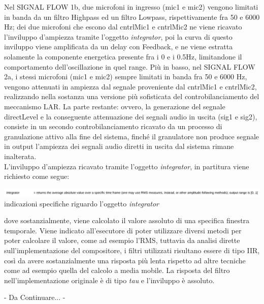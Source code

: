 Nel SIGNAL FLOW 1b,
due microfoni in ingresso (mic1 e mic2) vengono limitati in banda da un filtro Highpass ed 
un filtro Lowpass, rispettivamente fra 50 e 6000 Hz; dei due microfoni che escono 
dal cntrlMic1 e cntrlMic2 ne viene ricavato l'inviluppo d'ampiezza tramite
l'oggetto \textit{integrator}, poi la curva di questo inviluppo viene amplificata da 
un delay con Feedback, e ne viene estratta solamente la componente energetica 
presente fra i 0 e i 0.5Hz, limitandone il comportamento dell'oscillazione in quel range.
Più in basso, nel SIGNAL FLOW 2a, i stessi microfoni (mic1 e mic2) sempre
limitati in banda fra 50 e 6000 Hz, vengono attenuati in ampiezza dal segnale
proveniente dal cntrlMic1 e cntrlMic2, realizzando nella sostanza una 
versione più sofisticata del controbilanciamento del meccanismo LAR.
La parte restante: ovvero, la generazione del segnale directLevel e la 
conseguente attenuazione dei segnali audio in uscita (sig1 e sig2),
consiste in un secondo controbilanciamento ricavato da un processo di granulazione
attivo alla fine del sistema, finché il granulatore non produce segnale in output 
l'ampiezza dei segnali audio diretti in uscita dal sistema rimane inalterata. \\
L'inviluppo d'ampiezza ricavato tramite l'oggetto \textit{integrator}, in partitura 
viene richiesto come segue:

\begin{center}
    \includegraphics[width=14cm]{figures/integratorae2.pdf} \\
    {indicazioni specifiche riguardo l'oggetto \textit{integrator}} \\
    \vspace{0.5cm}
    \end{center}

dove sostanzialmente, viene calcolato il valore assoluto di una specifica finestra temporale. 
Viene indicato all'esecutore di poter utilizzare diversi metodi per poter calcolare il valore, come ad esempio l'RMS, 
tuttavia da analisi dirette sull'implementazione del compositore, i filtri utilizzati risultano essere di tipo IIR,
così da avere sostanzialmente una risposta più lenta rispetto ad altre tecniche come ad esempio quella del calcolo a media mobile.  
La risposta del filtro nell'implementazione originale è di tipo \textit{tau} e l'inviluppo è assoluto.


\Huge - Da Continuare... - \normalsize
